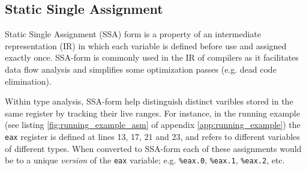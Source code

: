 
\subsection{Static Single Assignment}

Static Single Assignment (SSA) form is a property of an intermediate representation (IR) in which each variable is defined before use and assigned exactly once. SSA-form is commonly used in the IR of compilers as it facilitates data flow analysis and simplifies some optimization passes (e.g. dead code elimination).


Within type analysis, SSA-form help distinguish distinct varibles stored in the same register by tracking their live ranges. For instance, in the running example (see listing \ref{fig:running_example_asm} of appendix \ref{app:running_example}) the \texttt{eax} register is defined at lines 13, 17, 21 and 23, and refers to different variables of different types. When converted to SSA-form each of these assignments would be to a unique \textit{version} of the \texttt{eax} variable; e.g. \texttt{\%eax.0}, \texttt{\%eax.1}, \texttt{\%eax.2}, etc.


